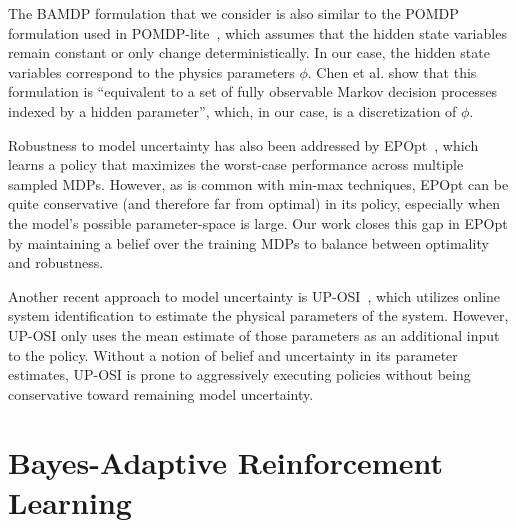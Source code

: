 \documentclass{article}
\begin{document}
%
The BAMDP formulation that we consider is also similar to the POMDP formulation used in POMDP-lite~\cite{chen2016pomdp}, which assumes that the hidden state variables remain constant or only change deterministically.
In our case, the hidden state variables correspond to the physics parameters $\phi$.
Chen et al. show that this formulation is ``equivalent to a set of fully observable Markov decision processes indexed by a hidden parameter'', which, in our case, is a discretization of $\phi$.

Robustness to model uncertainty has also been addressed by EPOpt~\cite{rajeswaran2016epopt}, which learns a policy that maximizes the worst-case performance across multiple sampled MDPs.
However, as is common with min-max techniques, EPOpt can be quite conservative (and therefore far from optimal) in its policy, especially when the model's possible parameter-space is large.
Our work closes this gap in EPOpt by maintaining a belief over the training MDPs to balance between optimality and robustness.

Another recent approach to model uncertainty is UP-OSI~\cite{yu2017uposi}, which utilizes online system identification to estimate the physical parameters of the system.
However, UP-OSI only uses the mean estimate of those parameters as an additional input to the policy.
Without a notion of belief and uncertainty in its parameter estimates, UP-OSI is prone to aggressively executing policies without being conservative toward remaining model uncertainty.


\section{Bayes-Adaptive Reinforcement Learning}
\end{document}
